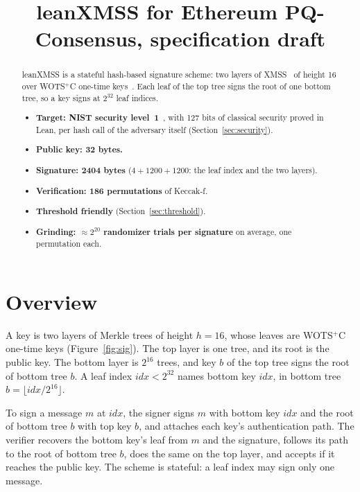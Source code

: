 \documentclass[11pt]{article}
\title{leanXMSS for Ethereum PQ-Consensus, specification draft}
\author{}
\date{}
\newcommand{\idx}{\mathit{idx}}
\begin{document}
\maketitle

\begin{abstract}
leanXMSS is a stateful hash-based signature scheme: two layers of XMSS~\cite{RFC8391} of height 16 over WOTS$^+$C one-time keys~\cite{HK22C,DKKW25}. Each leaf of the top tree signs the root of one bottom tree, so a key signs at $2^{32}$ leaf indices.
\begin{itemize}
  \item \textbf{Target: NIST security level~1}~\cite{NISTPQC}, with 127 bits of classical security proved in Lean, per hash call of the adversary itself (Section~\ref{sec:security}).
  \item \textbf{Public key: 32 bytes.}
  \item \textbf{Signature: 2404 bytes} ($4+1200+1200$: the leaf index and the two layers).
  \item \textbf{Verification: 186 permutations} of Keccak-f.
  \item \textbf{Threshold friendly} (Section~\ref{sec:threshold}).
  \item \textbf{Grinding: $\approx2^{20}$ randomizer trials per signature} on average, one permutation each.
\end{itemize}
\end{abstract}

\section{Overview}

A key is two layers of Merkle trees of height $h=16$, whose leaves are WOTS$^+$C one-time keys (Figure~\ref{fig:sig}). The top layer is one tree, and its root is the public key. The bottom layer is $2^{16}$ trees, and key $b$ of the top tree signs the root of bottom tree $b$. A leaf index $\idx<2^{32}$ names bottom key $\idx$, in bottom tree $b=\lfloor\idx/2^{16}\rfloor$.

To sign a message $m$ at $\idx$, the signer signs $m$ with bottom key $\idx$ and the root of bottom tree $b$ with top key $b$, and attaches each key's authentication path. The verifier recovers the bottom key's leaf from $m$ and the signature, follows its path to the root of bottom tree $b$, does the same on the top layer, and accepts if it reaches the public key. The scheme is stateful: a leaf index may sign only one message.
\end{document}
